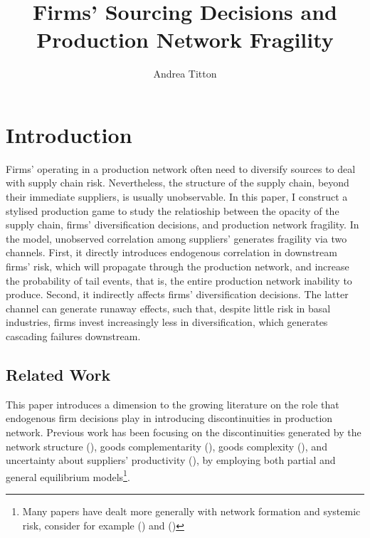 \documentclass[american, abstract=on]{scrartcl}
\author{Andrea Titton}
\title{Firms' Sourcing Decisions and\\ Production Network Fragility}
\theoremstyle{plain}
\newcommand{\citein}[1]{\citeauthor{#1} (\citeyear{#1})}
\newcommand\notes[1]{\textcolor{teal}{\footnotesize \textbf{#1}}}
\begin{document}
\maketitle
\section{Introduction}

\iffalse
\notes{
  \begin{enumerate}
    \item Research question
    \item Contribution to the literature
    \item Why do we care?
  \end{enumerate}
}
\fi

Firms' operating in a production network often need to diversify sources to deal with supply chain risk. Nevertheless, the structure of the supply chain, beyond their immediate suppliers, is usually unobservable. In this paper, I construct a stylised production game to study the relatioship between the opacity of the supply chain, firms' diversification decisions, and production network fragility. In the model, unobserved correlation among suppliers' generates fragility via two channels. First, it directly introduces endogenous correlation in downstream firms' risk, which will propagate through the production network, and increase the probability of tail events, that is, the entire production network inability to produce. Second, it indirectly affects firms' diversification decisions. The latter channel can generate runaway effects, such that, despite little risk in basal industries, firms invest increasingly less in diversification, which generates cascading failures downstream.

\subsection{Related Work}

This paper introduces a dimension to the growing literature on the role that endogenous firm decisions play in introducing discontinuities in production network. Previous work has been focusing on the discontinuities generated by the network structure (\cite{baqaee_macroeconomic_2019}), goods complementarity (\cite{acemoglu_endogenous_2020}), goods complexity (\cite{elliott_supply_2022}), and uncertainty about suppliers' productivity (\cite{kopytov_endogenous_2021}), by employing both partial and general equilibrium models\footnote{Many papers have dealt more generally with network formation and systemic risk, consider for example \citein{amelkin_strategic_2020} and \citein{erol_network_2014}}.
\end{document}

